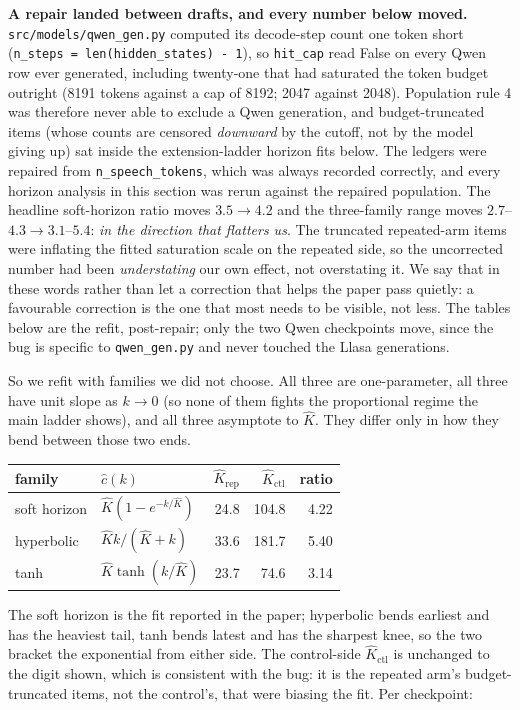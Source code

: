 \documentclass[11pt]{article}
\begin{document}
\noindent\textbf{A repair landed between drafts, and every number below moved.}
\texttt{src/models/qwen\_gen.py} computed its decode-step count one token short
(\texttt{n\_steps = len(hidden\_states) - 1}), so \texttt{hit\_cap} read False on
every Qwen row ever generated, including twenty-one that had saturated the
token budget outright (8191 tokens against a cap of 8192; 2047 against 2048).
Population rule 4 was therefore never able to exclude a Qwen generation, and
budget-truncated items (whose counts are censored \emph{downward} by the
cutoff, not by the model giving up) sat inside the extension-ladder horizon
fits below. The ledgers were repaired from \texttt{n\_speech\_tokens}, which was
always recorded correctly, and every horizon analysis in this section was rerun
against the repaired population. The headline soft-horizon ratio moves
$3.5\to4.2$ and the three-family range moves $2.7$--$4.3\to3.1$--$5.4$:
\emph{in the direction that flatters us}. The truncated repeated-arm items were
inflating the fitted saturation scale on the repeated side, so the uncorrected
number had been \emph{understating} our own effect, not overstating it. We say
that in these words rather than let a correction that helps the paper pass
quietly: a favourable correction is the one that most needs to be visible, not
less. The tables below are the refit, post-repair; only the two Qwen checkpoints
move, since the bug is specific to \texttt{qwen\_gen.py} and never touched the
Llasa generations.

So we refit with families we did not choose. All three are one-parameter, all
three have unit slope as $k\to0$ (so none of them fights the proportional
regime the main ladder shows), and all three asymptote to $\hat K$. They differ
only in how they bend between those two ends.

\begin{center}
\begin{tabular}{llrrr}
\toprule
family & $\hat c(k)$ & $\hat K_{\mathrm{rep}}$ & $\hat K_{\mathrm{ctl}}$ & ratio \\
\midrule
soft horizon & $\hat K(1-e^{-k/\hat K})$ & 24.8 & 104.8 & 4.22 \\
hyperbolic   & $\hat K k/(\hat K+k)$     & 33.6 & 181.7 & 5.40 \\
tanh         & $\hat K\tanh(k/\hat K)$   & 23.7 &  74.6 & 3.14 \\
\bottomrule
\end{tabular}
\end{center}

\noindent The soft horizon is the fit reported in the paper; hyperbolic bends
earliest and has the heaviest tail, tanh bends latest and has the sharpest knee,
so the two bracket the exponential from either side. The control-side $\hat
K_{\mathrm{ctl}}$ is unchanged to the digit shown, which is consistent with the
bug: it is the repeated arm's budget-truncated items, not the control's, that
were biasing the fit. Per checkpoint:
\end{document}
